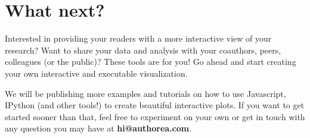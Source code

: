 \section{What next?}

Interested in providing your readers with a more interactive view of your research? Want to share your data and analysis with your coauthors, peers, colleagues (or the public)? These tools are for you! Go ahead and start creating your own interactive and executable visualization.

We will be publishing more examples and tutorials on how to use Javascript, IPython (and other tools!) to create beautiful interactive plots. If you want to get started sooner than that, feel free to experiment on your own or get in touch with any question you may have at \textbf{hi@authorea.com}. 